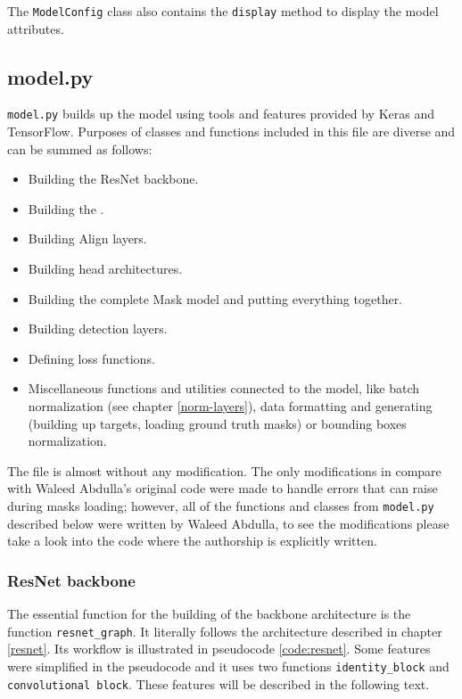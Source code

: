 The \verb|ModelConfig| class also contains the \verb|display| method to display 
the model attributes.

\subsection{model.py}
\label{model}

\verb|model.py| builds up the model using tools and features provided by Keras 
and TensorFlow. Purposes of classes and functions included in this file are 
diverse and can be summed as follows:
\begin{itemize}
	\item Building the ResNet backbone.
	\item Building the .
	\item Building Align layers.
	\item Building head architectures.
	\item Building the complete Mask  model and putting everything together.
	\item Building detection layers.
	\item Defining loss functions.
	\item Miscellaneous functions and utilities connected to the model, like batch normalization (see chapter \ref{norm-layers}), data formatting and generating (building up targets, loading ground truth masks) or bounding boxes normalization.
\end{itemize}

The file is almost without any modification. The only modifications in compare 
with Waleed Abdulla's original code were made to handle errors that can raise 
during masks loading; however, all of the functions and classes from 
\verb|model.py| described below were written by Waleed Abdulla, to see the 
modifications please take a look into the code where the authorship is 
explicitly written.

\subsubsection{ResNet backbone}
\label{model-resnet}

The essential function for the building of the backbone architecture is the 
function \verb|resnet_graph|. It literally follows the architecture described in 
chapter \ref{resnet}. Its workflow is illustrated in pseudocode 
\ref{code:resnet}. Some features were simplified in the pseudocode and it uses 
two functions \verb|identity_block| and \verb|convolutional block|. These 
features will be described in the following text.

